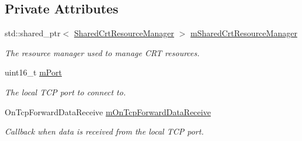 \subsection*{Private Attributes}
\begin{DoxyCompactItemize}
\item 
\mbox{\label{class_aws_1_1_iot_1_1_device_client_1_1_secure_tunneling_1_1_tcp_forward_a6f68f3a182d517fed7376e8874207b7a}} 
std\+::shared\+\_\+ptr$<$ \hyperlink{class_aws_1_1_iot_1_1_device_client_1_1_shared_crt_resource_manager}{Shared\+Crt\+Resource\+Manager} $>$ \hyperlink{class_aws_1_1_iot_1_1_device_client_1_1_secure_tunneling_1_1_tcp_forward_a6f68f3a182d517fed7376e8874207b7a}{m\+Shared\+Crt\+Resource\+Manager}
\begin{DoxyCompactList}\small\item\em The resource manager used to manage C\+RT resources. \end{DoxyCompactList}\item 
\mbox{\label{class_aws_1_1_iot_1_1_device_client_1_1_secure_tunneling_1_1_tcp_forward_a991b1bb00f6389f3a9e49984c09cfd18}} 
uint16\+\_\+t \hyperlink{class_aws_1_1_iot_1_1_device_client_1_1_secure_tunneling_1_1_tcp_forward_a991b1bb00f6389f3a9e49984c09cfd18}{m\+Port}
\begin{DoxyCompactList}\small\item\em The local T\+CP port to connect to. \end{DoxyCompactList}\item 
\mbox{\label{class_aws_1_1_iot_1_1_device_client_1_1_secure_tunneling_1_1_tcp_forward_a7260f7982d221b29480ab16092505b2e}} 
On\+Tcp\+Forward\+Data\+Receive \hyperlink{class_aws_1_1_iot_1_1_device_client_1_1_secure_tunneling_1_1_tcp_forward_a7260f7982d221b29480ab16092505b2e}{m\+On\+Tcp\+Forward\+Data\+Receive}
\begin{DoxyCompactList}\small\item\em Callback when data is received from the local T\+CP port. \end{DoxyCompactList}\item 
\mbox{\label{class_aws_1_1_iot_1_1_device_client_1_1_secure_tunneling_1_1_tcp_forward_a624e8376d97bd12aa650e3cd018efd7a}} 

\end{DoxyCompactItemize}
